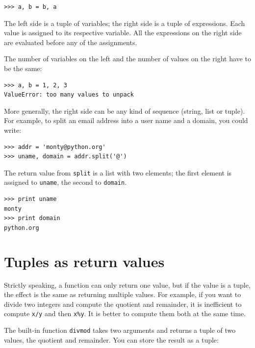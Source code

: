\documentclass[10pt]{book}
\begin{document}
\beforeverb
\begin{verbatim}
>>> a, b = b, a
\end{verbatim}
\afterverb
%
The left side is a tuple of variables; the right side is a tuple of
expressions.  Each value is assigned to its respective variable.  
All the expressions on the right side are evaluated before any
of the assignments.

The number of variables on the left and the number of
values on the right have to be the same:


\beforeverb
\begin{verbatim}
>>> a, b = 1, 2, 3
ValueError: too many values to unpack
\end{verbatim}
\afterverb
%
More generally, the right side can be any kind of sequence
(string, list or tuple).  For example, to split an email address
into a user name and a domain, you could write:


\beforeverb
\begin{verbatim}
>>> addr = 'monty@python.org'
>>> uname, domain = addr.split('@')
\end{verbatim}
\afterverb
%
The return value from {\tt split} is a list with two elements;
the first element is assigned to {\tt uname}, the second to
{\tt domain}.

\beforeverb
\begin{verbatim}
>>> print uname
monty
>>> print domain
python.org
\end{verbatim}
\afterverb
%

\section{Tuples as return values}


Strictly speaking, a function can only return one value, but
if the value is a tuple, the effect is the same as returning
multiple values.  For example, if you want to divide two integers
and compute the quotient and remainder, it is inefficient to
compute {\tt x/y} and then {\tt x\%y}.  It is better to compute
them both at the same time.


The built-in function {\tt divmod} takes two arguments and
returns a tuple of two values, the quotient and remainder.
You can store the result as a tuple:
\end{document}
